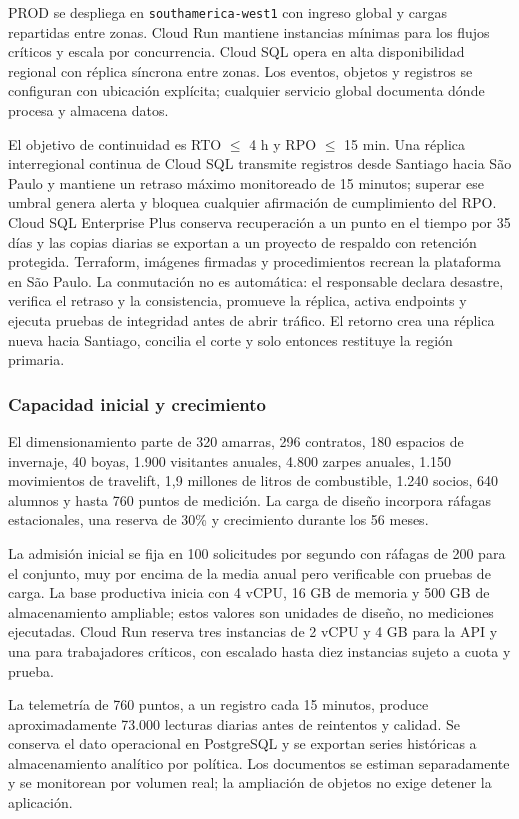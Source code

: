 \documentclass[11pt,letterpaper]{report}
\providecommand{\RTO}{RTO $\leq$ 4 h}
\providecommand{\RPO}{RPO $\leq$ 15 min}
\begin{document}
PROD se despliega en \texttt{southamerica-west1} con ingreso global y cargas repartidas entre zonas. Cloud Run mantiene instancias mínimas para los flujos críticos y escala por concurrencia. Cloud SQL opera en alta disponibilidad regional con réplica síncrona entre zonas. Los eventos, objetos y registros se configuran con ubicación explícita; cualquier servicio global documenta dónde procesa y almacena datos.

El objetivo de continuidad es \RTO{} y \RPO{}. Una réplica interregional continua de Cloud SQL transmite registros desde Santiago hacia São Paulo y mantiene un retraso máximo monitoreado de 15 minutos; superar ese umbral genera alerta y bloquea cualquier afirmación de cumplimiento del RPO. Cloud SQL Enterprise Plus conserva recuperación a un punto en el tiempo por 35 días y las copias diarias se exportan a un proyecto de respaldo con retención protegida. Terraform, imágenes firmadas y procedimientos recrean la plataforma en São Paulo. La conmutación no es automática: el responsable declara desastre, verifica el retraso y la consistencia, promueve la réplica, activa endpoints y ejecuta pruebas de integridad antes de abrir tráfico. El retorno crea una réplica nueva hacia Santiago, concilia el corte y solo entonces restituye la región primaria.

\subsubsection*{Capacidad inicial y crecimiento}

El dimensionamiento parte de 320 amarras, 296 contratos, 180 espacios de invernaje, 40 boyas, 1.900 visitantes anuales, 4.800 zarpes anuales, 1.150 movimientos de travelift, 1,9 millones de litros de combustible, 1.240 socios, 640 alumnos y hasta 760 puntos de medición. La carga de diseño incorpora ráfagas estacionales, una reserva de 30\% y crecimiento durante los 56 meses.

La admisión inicial se fija en 100 solicitudes por segundo con ráfagas de 200 para el conjunto, muy por encima de la media anual pero verificable con pruebas de carga. La base productiva inicia con 4 vCPU, 16 GB de memoria y 500 GB de almacenamiento ampliable; estos valores son unidades de diseño, no mediciones ejecutadas. Cloud Run reserva tres instancias de 2 vCPU y 4 GB para la API y una para trabajadores críticos, con escalado hasta diez instancias sujeto a cuota y prueba.

La telemetría de 760 puntos, a un registro cada 15 minutos, produce aproximadamente 73.000 lecturas diarias antes de reintentos y calidad. Se conserva el dato operacional en PostgreSQL y se exportan series históricas a almacenamiento analítico por política. Los documentos se estiman separadamente y se monitorean por volumen real; la ampliación de objetos no exige detener la aplicación.
\end{document}
